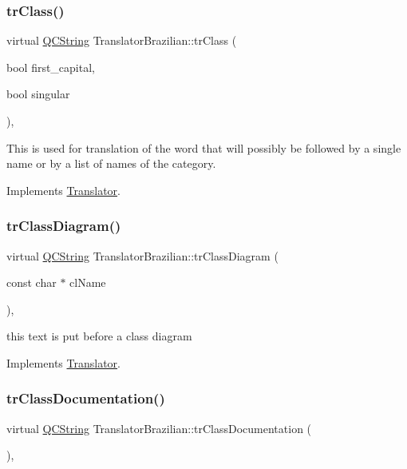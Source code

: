 \subsubsection{\texorpdfstring{trClass()}{trClass()}}
{\footnotesize\ttfamily virtual \mbox{\hyperlink{class_q_c_string}{Q\+C\+String}} Translator\+Brazilian\+::tr\+Class (\begin{DoxyParamCaption}\item[{bool}]{first\+\_\+capital,  }\item[{bool}]{singular }\end{DoxyParamCaption})\hspace{0.3cm}{\ttfamily [inline]}, {\ttfamily [virtual]}}

This is used for translation of the word that will possibly be followed by a single name or by a list of names of the category. 

Implements \mbox{\hyperlink{class_translator}{Translator}}.

\mbox{\label{class_translator_brazilian_a895ba7076bd6366ad6b35eefbf930ab3}} 
\subsubsection{\texorpdfstring{trClassDiagram()}{trClassDiagram()}}
{\footnotesize\ttfamily virtual \mbox{\hyperlink{class_q_c_string}{Q\+C\+String}} Translator\+Brazilian\+::tr\+Class\+Diagram (\begin{DoxyParamCaption}\item[{const char $\ast$}]{cl\+Name }\end{DoxyParamCaption})\hspace{0.3cm}{\ttfamily [inline]}, {\ttfamily [virtual]}}

this text is put before a class diagram 

Implements \mbox{\hyperlink{class_translator}{Translator}}.

\mbox{\label{class_translator_brazilian_a898900f3ce66326d99b48d70a21bae97}} 
\subsubsection{\texorpdfstring{trClassDocumentation()}{trClassDocumentation()}}
{\footnotesize\ttfamily virtual \mbox{\hyperlink{class_q_c_string}{Q\+C\+String}} Translator\+Brazilian\+::tr\+Class\+Documentation (\begin{DoxyParamCaption}{ }\end{DoxyParamCaption})\hspace{0.3cm}{\ttfamily [inline]}, {\ttfamily [virtual]}}

